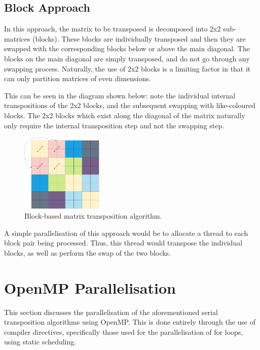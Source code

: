 \documentclass[journal,10pt]{IEEEtran}
\begin{document}
\subsection{Block Approach}
In this approach, the matrix to be transposed is decomposed into 2x2 sub-matrices (blocks). These blocks are individually transposed and then they are swapped with the corresponding blocks below or above the main diagonal. The blocks on the main diagonal are simply transposed, and do not go through any swapping process. Naturally, the use of 2x2 blocks is a limiting factor in that it can only partition matrices of even dimensions.



This can be seen in the diagram shown below: note the individual internal transpositions of the 2x2 blocks, and the subsequent swapping with like-coloured blocks. The 2x2 blocks which exist along the diagonal of the matrix naturally only require the internal transposition step and not the swapping step. 

\begin{figure}[H]
    \centering
    \includegraphics[width=0.35\textwidth]{block.pdf}
    \caption{Block-based matrix transposition algorithm.}
    \label{fig:my_label}
\end{figure}

A simple parallelisation of this approach would be to allocate a thread to each block pair being processed. Thus, this thread would transpose the individual blocks, as well as perform the swap of the two blocks.


\section{OpenMP Parallelisation}

This section discusses the parallelisation of the aforementioned serial transposition algorithms using OpenMP. This is done entirely through the use of compiler directives, specifically those used for the parallelisation of for loops, using static scheduling.
\end{document}
